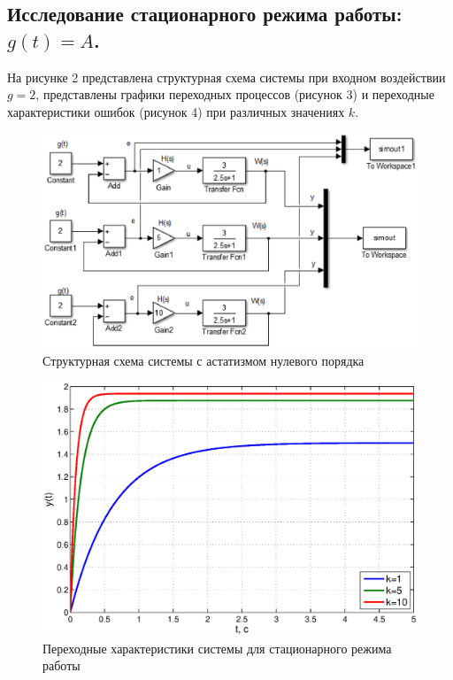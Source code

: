 \documentclass[12pt,a4paper]{article}
\begin{document}
\subsection{Исследование стационарного режима работы: $g(t)=A$.} 
На рисунке 2 представлена структурная схема системы при входном воздействии $g=2$, представлены графики переходных процессов (рисунок 3) и переходные характеристики ошибок (рисунок 4) при различных значениях $k$. 
\begin{figure}[h!]
	\centering
	\includegraphics[width=0.8\linewidth]{cxema1.eps}
	\caption{Структурная схема системы с астатизмом нулевого порядка}
\end{figure}
\begin{figure}[H]
	\centering
	\includegraphics[width=1\linewidth]{1.1.1.eps}
	\caption{Переходные характеристики системы для стационарного режима работы}
\end{figure}
\end{document}

